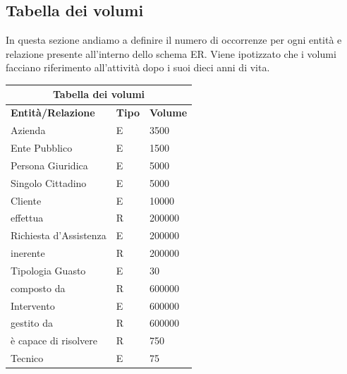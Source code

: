 \documentclass[legalpaper]{article}
\begin{document}
	\subsection{Tabella dei volumi}
		In questa sezione andiamo a definire il numero di occorrenze per ogni entità e relazione presente all'interno dello schema ER. Viene ipotizzato che i volumi facciano riferimento all'attività dopo i suoi dieci anni di vita.\\
		\newline
		\renewcommand\arraystretch{2}
		\begin{tabular}{ |p{5cm}|p{2cm}|p{5cm}| }
			\hline
			\multicolumn{3}{|c|}{\textbf{Tabella dei volumi}} \\
			\hline
			\textbf{Entità/Relazione} & \textbf{Tipo} & \textbf{Volume} \\
			\hline
			Azienda & E & 3500 \\ \hline
			Ente Pubblico & E & 1500 \\ \hline
			Persona Giuridica & E & 5000 \\ \hline
			Singolo Cittadino & E & 5000 \\ \hline
			Cliente & E & 10000 \\ \hline
			effettua & R & 200000 \\ \hline
			Richiesta d'Assistenza & E & 200000 \\ \hline
			inerente & R & 200000 \\ \hline
			Tipologia Guasto & E & 30 \\ \hline
			composto da & R & 600000 \\ \hline
			Intervento & E & 600000 \\ \hline
			gestito da & R & 600000 \\ \hline
			è capace di risolvere & R & 750 \\ \hline
			Tecnico & E & 75 \\ \hline
		\end{tabular}

	
\end{document}
